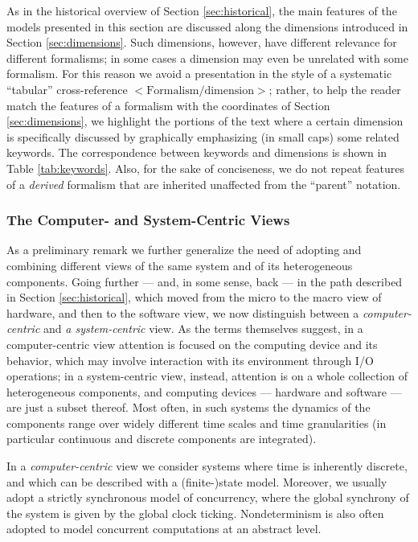 As in the historical overview of Section \ref{sec:historical}, the
main features of the models presented in this section are discussed
along the dimensions introduced in Section \ref{sec:dimensions}. Such
dimensions, however, have different relevance for different
formalisms; in some cases a dimension may even be unrelated with some
formalism. For this reason we avoid a presentation in the style of a
systematic ``tabular'' cross-reference $<\text{Formalism}/\text{dimension}>$; rather,
to help the reader match the features of a formalism with the
coordinates of Section \ref{sec:dimensions}, we highlight the portions
of the text where a certain dimension is specifically discussed by
graphically emphasizing (in small caps) some related
keywords. The correspondence between keywords and dimensions is shown
in Table \ref{tab:keywords}. Also, for the sake of conciseness, we do
not repeat features of a \emph{derived} formalism that are inherited
unaffected from the ``parent'' notation.



\subsubsection*{The Computer- and System-Centric Views}
As a preliminary remark we further generalize the need of adopting 
and combining different views of the same system and of its heterogeneous 
components. Going further --- and, in some sense, back --- in the path 
described in Section \ref{sec:historical}, which moved from the micro to the macro 
view of hardware, and then to the software view, we now distinguish 
between a \emph{computer-centric} and \emph{a system-centric} view. 
As the terms themselves suggest, in a computer-centric view attention 
is focused on the computing device and its behavior, which may 
involve interaction with its environment through I/O operations; 
in a system-centric view, instead, attention is on a whole collection 
of heterogeneous components, and computing devices --- hardware 
and software --- are just a subset thereof. Most often, in such 
systems the dynamics of the components range over widely different 
time scales and time granularities (in particular continuous 
and discrete components are integrated).

In a \emph{computer-centric} view we consider systems where 
time is inherently discrete, and which can be described with 
a (finite-)state model. Moreover, we usually adopt a strictly 
synchronous model of concurrency, where the global synchrony 
of the system is given by the global clock ticking. Nondeterminism 
is also often adopted to model concurrent computations at an 
abstract level.

